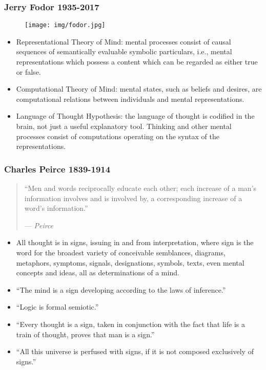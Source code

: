 \documentclass[UTF8,11pt,colorlinks,compress,openany]{beamer}%
\begin{document}
\begin{frame}\frametitle{Jerry Fodor 1935-2017}
\begin{figure}[H]
\texttt{[image: img/fodor.jpg]}
\end{figure}
\begin{itemize}
	\item Representational Theory of Mind: mental processes consist of causal sequences of semantically evaluable symbolic particulars, i.e., mental representations which possess a content which can be regarded as either true or false.
	\item Computational Theory of Mind: mental states, such as beliefs and desires, are computational relations between individuals and mental representations.
	\item Language of Thought Hypothesis: the language of thought is codified in the brain, not just a useful explanatory tool. Thinking and other mental processes consist of computations operating on the syntax of the representations.
\end{itemize}
\end{frame}

\begin{frame}\frametitle{Charles Peirce 1839-1914}
\begin{quote}
``Men and words reciprocally educate each other; each increase of a man's information involves and is involved by, a corresponding increase of a word's information.''\par
\hfill --- \textsl{Peirce}
\end{quote}
\begin{itemize}
	\item All thought is in signs, issuing in and from interpretation, where sign is the word for the broadest variety of conceivable semblances, diagrams, metaphors, symptoms, signals, designations, symbols, texts, even mental concepts and ideas, all as determinations of a mind.
	\item ``The mind is a sign developing according to the laws of inference.''
	\item ``Logic is formal semiotic.''
	\item ``Every thought is a sign, taken in conjunction with the fact that life is a train of thought, proves that man is a sign.''
	\item ``All this universe is perfused with signs, if it is not composed exclusively of signs.''
\end{itemize}
\end{frame}
\end{document}
